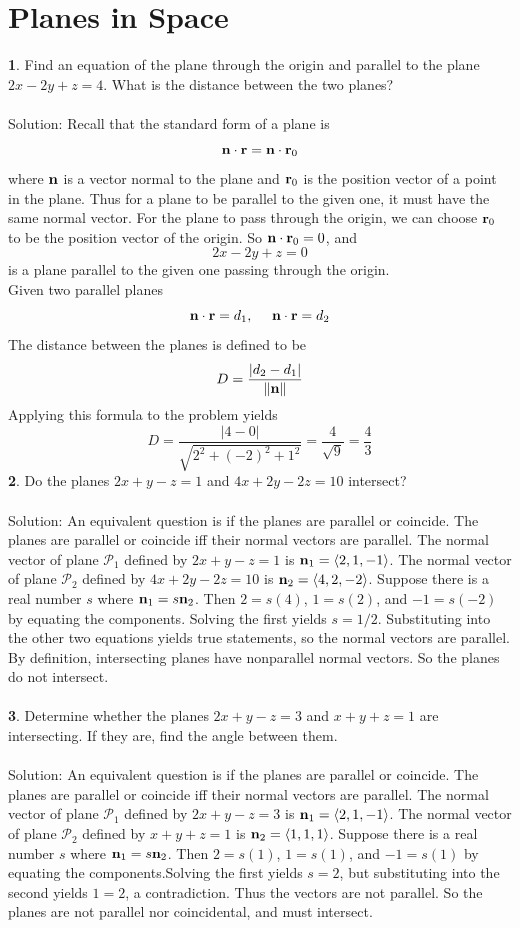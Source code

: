 \documentclass[12pt]{amsbook}
\newcommand{\la}{\langle}
\newcommand{\ra}{\rangle}
\begin{document}
\newpage
\section{Planes in Space}

\noindent
{\small\bf 1}. Find an equation of the plane through the origin and
parallel to the plane $2x-2y+z=4$. What is the distance between
the two planes?\\
\\
{\sc Solution}: Recall that the standard form of a plane is 
$${\bf n}\cdot {\bf r}={\bf n}\cdot {\bf r}_0$$
where $\bf n$ is a vector normal to the plane and ${\bf r}_0$ is the position vector of a point in the plane. Thus for a plane to be parallel to the given one, it must have the same normal vector. For the plane to pass through the origin, we can choose 
${\bf r}_0$ to be the position vector of the origin. So 
${\bf n} \cdot{\bf r}_0=0$, and
$$2x-2y+z=0$$
is a plane parallel to the given one passing through the origin.
\\
Given two parallel planes
$${\bf n}\cdot {\bf r}=d_1, \ \ \ \ {\bf n}\cdot {\bf r}=d_2$$
The distance between the planes is defined to be
$$D=\frac{|d_2-d_1|}{\|{\bf n}\|}$$
Applying this formula to the problem yields
$$D=\frac{|4-0|}{\sqrt{2^2+(-2)^2+1^2}}=\frac{4}{\sqrt{9}}=\frac{4}{3}$$
{\small\bf 2}. Do the planes $2x+y-z=1$ 
and $4x+2y-2z=10$ intersect?\\
\\
{\sc Solution}: An equivalent question is if the planes are parallel or coincide. The planes are parallel or coincide iff their normal vectors are parallel. The normal vector of plane $\mathcal{P}_1$ defined by $2x+y-z=1$ is ${\bf n}_1=\la 2,1,-1 \ra$. The normal vector of plane $\mathcal{P}_2$ defined by $4x+2y-2z=10$ is ${\bf n}_2=\la 4,2,-2 \ra$. Suppose there is a real number $s$ where ${\bf n}_1=s{\bf n}_2$. Then $2=s(4)$, $1=s(2)$, and $-1=s(-2)$ by equating the components. Solving the first yields $s=1/2$. Substituting into the other two equations yields true statements, so the normal vectors are parallel. By definition, intersecting planes have nonparallel normal vectors. So the planes do not intersect.
\\
\\
{\small\bf 3}. Determine whether the planes $2x+y-z=3$ and $x+y+z=1$
are intersecting. If they are, find the angle between them.\\
\\
{\sc Solution}: An equivalent question is if the planes are parallel or coincide. The planes are parallel or coincide iff their normal vectors are parallel. The normal vector of plane $\mathcal{P}_1$ defined by $2x+y-z=3$ is ${\bf n}_1=\la 2,1,-1 \ra$. The normal vector of plane $\mathcal{P}_2$ defined by $x+y+z=1$ is ${\bf n}_2=\la 1,1,1 \ra$. Suppose there is a real number $s$ where ${\bf n}_1=s{\bf n}_2$. Then $2=s(1)$, $1=s(1)$, and $-1=s(1)$ by equating the components.Solving the first yields $s=2$, but substituting into the second yields $1=2$, a contradiction. Thus the vectors are not parallel. So the planes are not parallel nor coincidental, and must intersect.
\end{document}
